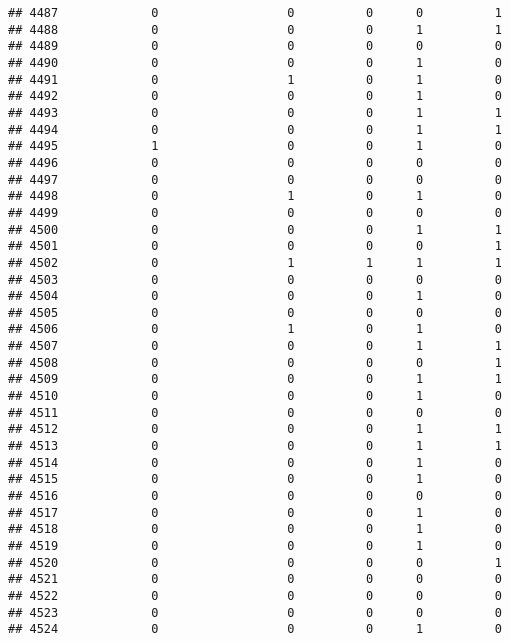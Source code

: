 \documentclass[
]{article}
\begin{document}
\begin{verbatim}
## 4487             0                  0          0      0          1
## 4488             0                  0          0      1          1
## 4489             0                  0          0      0          0
## 4490             0                  0          0      1          0
## 4491             0                  1          0      1          0
## 4492             0                  0          0      1          0
## 4493             0                  0          0      1          1
## 4494             0                  0          0      1          1
## 4495             1                  0          0      1          0
## 4496             0                  0          0      0          0
## 4497             0                  0          0      0          0
## 4498             0                  1          0      1          0
## 4499             0                  0          0      0          0
## 4500             0                  0          0      1          1
## 4501             0                  0          0      0          1
## 4502             0                  1          1      1          1
## 4503             0                  0          0      0          0
## 4504             0                  0          0      1          0
## 4505             0                  0          0      0          0
## 4506             0                  1          0      1          0
## 4507             0                  0          0      1          1
## 4508             0                  0          0      0          1
## 4509             0                  0          0      1          1
## 4510             0                  0          0      1          0
## 4511             0                  0          0      0          0
## 4512             0                  0          0      1          1
## 4513             0                  0          0      1          1
## 4514             0                  0          0      1          0
## 4515             0                  0          0      1          0
## 4516             0                  0          0      0          0
## 4517             0                  0          0      1          0
## 4518             0                  0          0      1          0
## 4519             0                  0          0      1          0
## 4520             0                  0          0      0          1
## 4521             0                  0          0      0          0
## 4522             0                  0          0      0          0
## 4523             0                  0          0      0          0
## 4524             0                  0          0      1          0

\end{verbatim}
\end{document}

